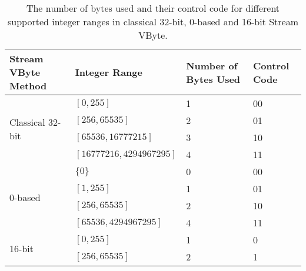 \begin{table}
\centering
    \caption{\label{tab:groupsvb}The number of bytes used and their control code for different supported integer ranges in classical 32-bit, 0-based and 16-bit Stream VByte.}
    \begin{tabular}{|l|l|l|l|}%
        \hline
        Stream VByte Method & Integer Range & Number of Bytes Used & Control Code\\
        \hline
	    \multirow{4}{3cm}{Classical 32-bit} & $[0,255]$ & 1 & 00\\
	    &$[256,65535]$ & 2 & 01\\
	    &$[65536,16777215]$ & 3 & 10\\
	    &$[16777216,4294967295]$ & 4 & 11\\
        \hline
	    \multirow{4}{4em}{0-based} &$\{0\}$ & 0 & 00\\
	    &$[1,255]$ & 1 & 01\\
	    &$[256,65535]$ & 2 & 10\\
	    &$[65536,4294967295]$ & 4 & 11\\
        \hline
	    \multirow{2}{4em}{16-bit}    &$[0,255]$ & 1 & 0\\
	    &$[256,65535]$ & 2 & 1\\
        \hline
    \end{tabular}
\end{table}

